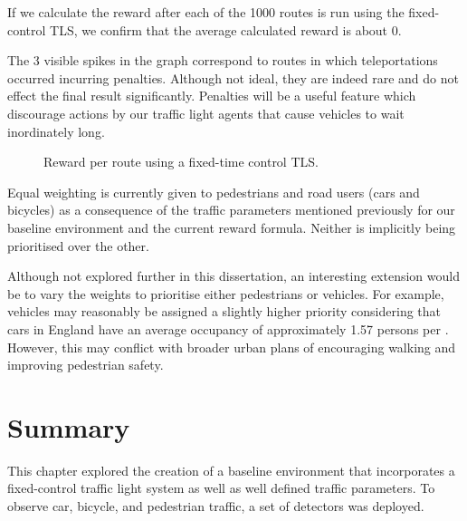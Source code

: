 \documentclass[a4paper]{report}
\begin{document}
If we calculate the reward after each of the 1000 routes is run using the fixed-control TLS, we confirm that the average calculated reward is about 0.

The 3 visible spikes in the graph correspond to routes in which teleportations occurred incurring penalties. Although not ideal, they are indeed rare and do not effect the final result significantly. Penalties will be a useful feature which discourage actions by our traffic light agents that cause vehicles to wait inordinately long.

\begin{figure}[H]
  \centering
  \caption{Reward per route using a fixed-time control TLS.}
\end{figure}

Equal weighting is currently given to pedestrians and road users (cars and bicycles) as a consequence of the traffic parameters mentioned previously for our baseline environment and the current reward formula. Neither is implicitly being prioritised over the other.

Although not explored further in this dissertation, an interesting extension would be to vary the weights to prioritise either pedestrians or vehicles. For example, vehicles may reasonably be assigned a slightly higher priority considering that cars in England have an average occupancy of approximately 1.57 persons per \cite{StatistaCarOccupancy}. However, this may conflict with broader urban plans of encouraging walking and improving pedestrian safety.

\section{Summary}

This chapter explored the creation of a baseline environment that incorporates a fixed-control traffic light system as well as well defined traffic parameters. To observe car, bicycle, and pedestrian traffic, a set of detectors was deployed.
\end{document}
